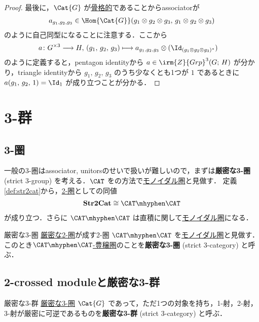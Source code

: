 \documentclass[TQFT_main]{subfiles}
\begin{document}
\begin{proof}
    最後に，$\Cat{G}$ が\hyperref[def:skeltal2G]{骨格的}であることからassociatorが
    \begin{align}
        a_{g_1,g_2,g_3} \in \Hom{\Cat{G}}(g_1 \otimes g_2 \otimes g_3,\, g_1 \otimes g_2 \otimes g_3)
    \end{align}
    のように自己同型になることに注意する．ここから
    \begin{align}
        a \colon G^{\times 3} \lto H,\, (g_1,\, g_2,\, g_3) &\lmto a_{g_1,g_2,g_3} \otimes (\Id_{(g_1 \otimes g_2 \otimes g_3)^*})
    \end{align}
    のように定義すると，pentagon identityから $a \in \irm{Z}{Grp}^3(G;\, H)$ が分かり，triangle identityから $g_1,\, g_2,\, g_3$ のうち少なくとも1つが $1$ であるときに $a(g_1,\, g_2,\, 1) = \Id_1$ が成り立つことが分かる．
\end{proof}


\section{3-群}

\subsection{3-圏}

一般の3-圏はassociator, unitorsのせいで扱いが難しいので，まずは\textbf{厳密な3-圏} (strict 3-group) を考える．$\CAT$ をの方法で\hyperref[redef:monoidal-category]{モノイダル圏}と見做す．
定義\ref{def:str2cat}から，\hyperref[def:2cat]{2-圏}としての同値
\begin{align}
    \bm{\mathrm{Str2Cat}} \cong \CAT\mhyphen\CAT
\end{align}
が成り立つ．さらに $\CAT\mhyphen\CAT$ は直積に関して\hyperref[redef:monoidal-category]{モノイダル圏}になる．

\begin{mydef}[label=def:str3cat]{厳密な3-圏}
    \hyperref[def:str2cat]{厳密な2-圏}が成す2-圏 $\CAT\mhyphen\CAT$ を\hyperref[redef:monoidal-category]{モノイダル圏}と見做す．
    このとき\hyperref[redef:enriched]{$\CAT\mhyphen\CAT$-豊穣圏}のことを\textbf{厳密な3-圏} (strict 3-category) と呼ぶ．
\end{mydef}

\subsection{2-crossed moduleと厳密な3-群}

\begin{mydef}[label=def:S3G]{厳密な3-群}
    \hyperref[def:str3cat]{厳密な3-圏} $\Cat{G}$ であって，ただ1つの対象を持ち，1-射，2-射，3-射が厳密に可逆であるものを\textbf{厳密な3-群} (strict 3-category) と呼ぶ．
\end{mydef}
\end{document}
